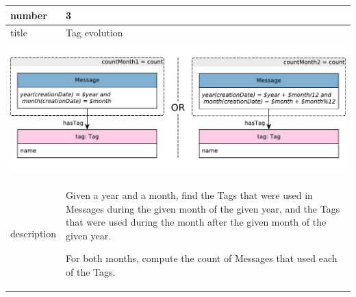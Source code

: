 \renewcommand*{\arraystretch}{1.5}
\noindent\begin{tabularx}{17cm}{|p{1.95cm}|X|}
	\hline
	number      & 3                                                          \\ \hline
	title       & Tag evolution                                                           \\ \hline
	\multicolumn{2}{|c|}{ \includegraphics[scale=\patternscale,margin=0cm .2cm]{patterns/q03}} \\ \hline
	description & Given a year and a month, find the Tags that were used in Messages
during the given month of the given year, and the Tags that were used
during the month after the given month of the given year.

For both months, compute the count of Messages that used each of the
Tags.
 \\ \hline
	

\end{tabularx}
